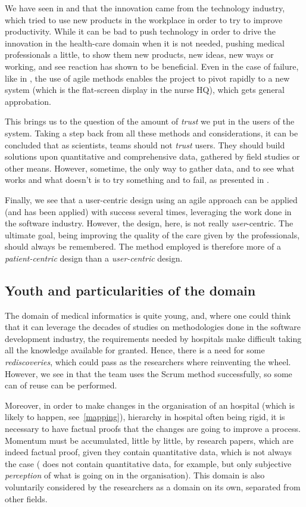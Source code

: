 \documentclass[a4paper,10pt]{article}
\begin{document}
\begin{multicols}{2}
We have seen in \cite{IndiaEMR} and \cite{Jalote2010} that the
innovation came from the technology industry, which tried to use new products in
the workplace in order to try to improve productivity. While it can be bad to
push technology in order to drive the innovation in the health-care domain when
it is not needed, pushing medical professionals a little, to show them new
products, new ideas, new ways or working, and see reaction has shown to be
beneficial. Even in the case of failure, like in \cite{Hasvold2011}, the use
of agile methods enables the project to pivot rapidly to a new system (which is
the flat-screen display in the nurse HQ), which gets general approbation.

This brings us to the question of the amount of \emph{trust} we put in the users of
the system. Taking a step back from all these methods and considerations, it can
be concluded that as scientists, teams should not \emph{trust} users. They
should build solutions upon quantitative and comprehensive data, gathered by
field studies or other means. However, sometime, the only way to gather data,
and to see what works and what doesn't is to try something and to fail, as presented in
\cite{Hasvold2011}.

Finally, we see that a user-centric design using an agile approach can be
applied (and has been applied) with success several times, leveraging the work
done in the software industry. However, the design, here, is not really
\emph{user}-centric. The ultimate goal, being improving the quality of the care
given by the professionals, should always be remembered. The method employed is
therefore more of a \emph{patient-centric} design than a \emph{user-centric}
design.

\subsection{Youth and particularities of the domain}
The domain of medical informatics is quite young, and, where one could think
that it can leverage the decades of studies on methodologies done in the software development
industry, the requirements needed by hospitals make difficult
taking all the knowledge available for granted. Hence, there is a need for some
\emph{rediscoveries}, which could pass as the researchers where reinventing the
wheel. However, we see in \cite{Hasvold2011} that the team uses the Scrum method
successfully, so some can of reuse can be performed.

Moreover, in order to make changes in the organisation of an hospital (which is
likely to happen, see~\ref{mapping}), hierarchy in hospital often being rigid,
it is necessary to have factual proofs that the changes are going to improve
a process. Momentum must be accumulated, little by little, by research papers,
which are indeed factual proof, given they contain quantitative
data, which is not always the case (\cite{Hasvold2011} does not contain
quantitative data, for example, but only subjective \emph{perception} of what is
going on in the organisation).
This domain is also voluntarily considered by the researchers as a domain on its
own, separated from other fields.


\end{multicols}
\end{document}
